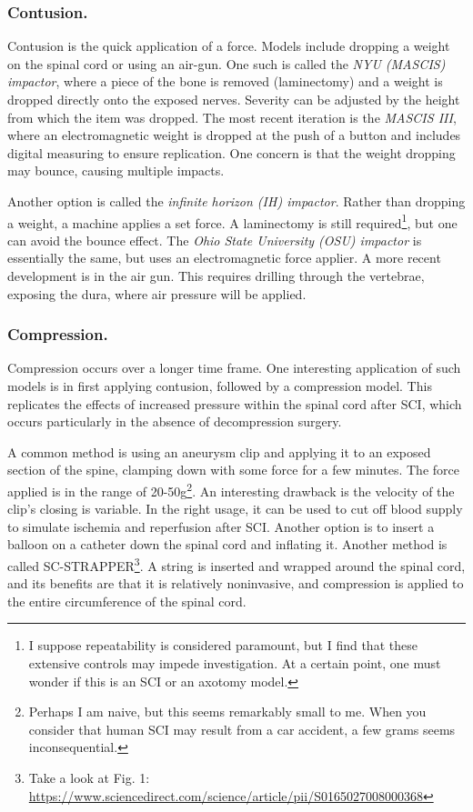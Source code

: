 \subsubsection{Contusion.}
Contusion is the quick application of a force. Models include dropping a weight on the spinal cord or using an air-gun. One such is called the \textit{NYU (MASCIS) impactor}, where a piece of the bone is removed (laminectomy) and a weight is dropped directly onto the exposed nerves. Severity can be adjusted by the height from which the item was dropped. The most recent iteration is the \textit{MASCIS III}, where an electromagnetic weight is dropped at the push of a button and includes digital measuring to ensure replication. One concern is that the weight dropping may bounce, causing multiple impacts.\newline

Another option is called the \textit{infinite horizon (IH) impactor}. Rather than dropping a weight, a machine applies a set force. A laminectomy is still required\footnote{I suppose repeatability is considered paramount, but I find that these extensive controls may impede investigation. At a certain point, one must wonder if this is an SCI or an axotomy model.}, but one can avoid the bounce effect. The \textit{Ohio State University (OSU) impactor} is essentially the same, but uses an electromagnetic force applier. A more recent development is in the air gun. This requires drilling through the vertebrae, exposing the dura, where air pressure will be applied. 


\subsubsection{Compression.}
Compression occurs over a longer time frame. One interesting application of such models is in first applying contusion, followed by a compression model. This replicates the effects of increased pressure within the spinal cord after SCI, which occurs particularly in the absence of decompression surgery.\newline

A common method is using an aneurysm clip and applying it to an exposed section of the spine, clamping down with some force for a few minutes. The force applied is in the range of 20-50g\footnote{Perhaps I am naive, but this seems remarkably small to me. When you consider that human SCI may result from a car accident, a few grams seems inconsequential.}. An interesting drawback is the velocity of the clip's closing is variable. In the right usage, it can be used to cut off blood supply to simulate ischemia and reperfusion after SCI. Another option is to insert a balloon on a catheter down the spinal cord and inflating it. Another method is called SC-STRAPPER\footnote{Take a look at Fig. 1: \url{https://www.sciencedirect.com/science/article/pii/S0165027008000368} }. A string is inserted and wrapped around the spinal cord, and its benefits are that it is relatively noninvasive, and compression is applied to the entire circumference of the spinal cord. 

